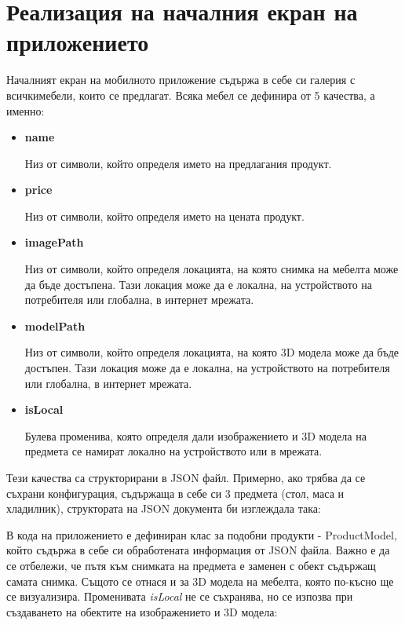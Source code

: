 \section{Реализация на началния екран на приложението}
Началният екран на мобилното приложение съдържа в себе си галерия с всичкимебели, които се предлагат. Всяка мебел се дефинира от 5 качества, а именно:
\begin{itemize}
    \item \textbf{name}\par
    Низ от символи, който определя името на предлагания продукт.

    \item \textbf{price}\par
    Низ от символи, който определя името на цената продукт.

    \item \textbf{imagePath}\par
    Низ от символи, който определя локацията, на която снимка на мебелта може да бъде достъпена. Тази локация може да е локална, на устройството на потребителя или глобална, в интернет мрежата.

    \item \textbf{modelPath}\par
    Низ от символи, който определя локацията, на която 3D модела може да бъде достъпен. Тази локация може да е локална, на устройството на потребителя или глобална, в интернет мрежата.

    \item \textbf{isLocal}\par
    Булева променива, която определя дали изображението и 3D модела на предмета се намират локално на устройството или в мрежата.
\end{itemize}

Тези качества са структорирани в JSON файл. Примерно, ако трябва да се съхрани конфигурация, съдържаща в себе си 3 предмета (стол, маса и хладилник), структората на JSON документа би изглеждала така:


В кода на приложението е дефиниран клас за подобни продукти - ProductModel, който съдържа в себе си обработената информация от JSON файла. Важно е да се отбележи, че пътя към снимката на предмета е заменен с обект съдържащ самата снимка. Същото се отнася и за 3D модела на мебелта, която по-късно ще се визуализира. Променивата \emph{isLocal} не се съхранява, но се изпозва при създаването на обектите на изображението и 3D модела:


